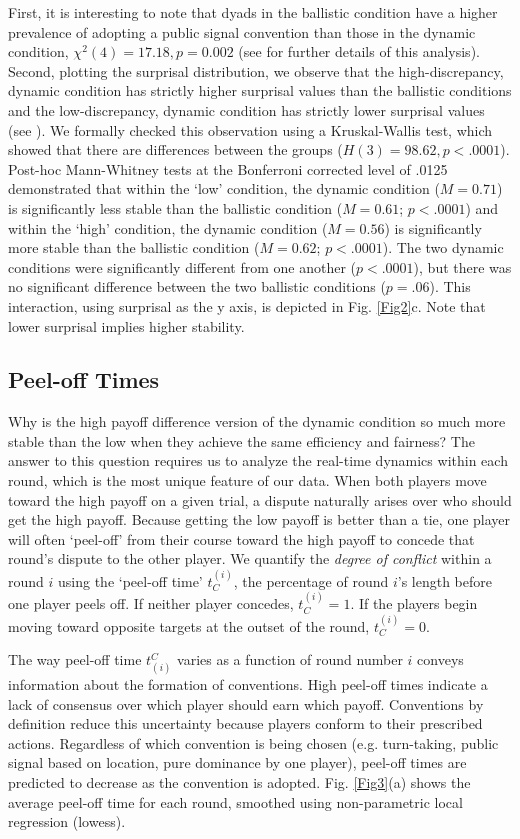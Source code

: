 \documentclass[10pt,letterpaper]{article}
\begin{document}
First, it is interesting to note that dyads in the ballistic condition have a higher prevalence of adopting a public signal convention than those in the dynamic condition, $\chi^2(4) = 17.18, p = 0.002$ (see  for further details of this analysis). Second, plotting the surprisal distribution, we observe that the high-discrepancy, dynamic condition has strictly higher surprisal values than the ballistic conditions and the low-discrepancy, dynamic condition has strictly lower surprisal values  (see ). We formally checked this observation using a Kruskal-Wallis test, which showed that there are differences between the groups ($H(3) = 98.62, p < .0001$). Post-hoc Mann-Whitney tests at the Bonferroni corrected level of .0125 demonstrated that within the `low' condition, the dynamic condition ($M = 0.71$) is significantly less stable than the ballistic condition ($M=0.61$; $p < .0001$) and within the `high' condition, the dynamic condition ($M=0.56$) is significantly more stable than the ballistic condition ($M=0.62$; $p < .0001$). The two dynamic conditions were significantly different from one another ($p < .0001$), but there was no significant difference between the two ballistic conditions ($p = .06$). This interaction, using surprisal as the y axis, is depicted in Fig. \ref{Fig2}c. Note that lower surprisal implies higher stability.


\subsection*{Peel-off Times} 
Why is the high payoff difference version of the dynamic condition so much more stable than the low when they achieve the same efficiency and fairness? The answer to this question requires us to analyze the real-time dynamics within each round, which is the most unique feature of our data. When both players move toward the high payoff on a given trial, a dispute naturally arises over who should get the high payoff. Because getting the low payoff is better than a tie, one player will often `peel-off' from their course toward the high payoff to concede that round's dispute to the other player. We quantify the \emph{degree of conflict} within a round $i$ using the `peel-off time' $t_C^{(i)}$, the percentage of round $i$'s length before one player peels off. If neither player concedes, $t_C^{(i)} = 1$. If the players begin moving toward opposite targets at the outset of the round, $t_C^{(i)} = 0$. 

The way peel-off time $t^C_{(i)}$ varies as a function of round number $i$ conveys information about the formation of conventions. High peel-off times indicate a lack of consensus over which player should earn which payoff. Conventions by definition reduce this uncertainty because players conform to their prescribed actions. Regardless of which convention is being chosen (e.g. turn-taking, public signal based on location, pure dominance by one player), peel-off times are predicted to decrease as the convention is adopted. Fig. \ref{Fig3}(a) shows the average peel-off time for each round, smoothed using non-parametric local regression (lowess). 
\end{document}
